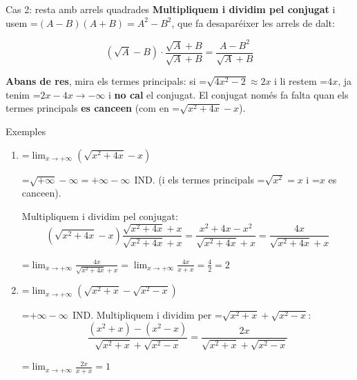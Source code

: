 \documentclass[11pt,a4paper]{article}
\newcommand{\fmm}[1]{\setbox0=\hbox{$#1$}\ifdim\wd0>\linewidth\[#1\]\else\mbox{\box0}\fi}
\newcommand{\fmuline}[1]{\textbf{\color{fmaccent}#1}}
\begin{document}
  
\begin{fmdef}{Cas 2: resta amb arrels quadrades}
\textbf{Multipliquem i dividim pel conjugat} i usem \fmm{(A-B)(A+B)=A^2-B^2}, que fa desaparéixer les arrels de dalt:

      
\[\left(\sqrt{A}-B\right)\cdot\frac{\sqrt{A}+B}{\sqrt{A}+B}=\frac{A-B^2}{\sqrt{A}+B}\]

      
\begin{fmnote}\fmuline{Abans de res}, mira els termes principals: si \fmm{\sqrt{4x^2-2}\approx2x} i li restem \fmm{4x}, ja tenim \fmm{2x-4x\to-\infty} i \textbf{no cal} el conjugat. El conjugat només fa falta quan els termes principals \textbf{es cance\lgem{}en} (com en \fmm{\sqrt{x^2+4x}-x}).\end{fmnote}
\end{fmdef}

  
\begin{fmex}{Exemples}
\begin{enumerate}[label=\textbf{\arabic*.},leftmargin=*]
\item \fmm{\displaystyle\lim_{x\to+\infty}\left(\sqrt{x^2+4x}-x\right)}
          

            

\fmm{\sqrt{+\infty}-\infty=+\infty-\infty\ \ \text{IND.}} (i els termes principals \fmm{\sqrt{x^2}=x} i \fmm{x} es cance\lgem{}en).

            

Multipliquem i dividim pel conjugat: 
\[\left(\sqrt{x^2+4x}-x\right)\frac{\sqrt{x^2+4x}+x}{\sqrt{x^2+4x}+x}=\frac{x^2+4x-x^2}{\sqrt{x^2+4x}+x}=\frac{4x}{\sqrt{x^2+4x}+x}\]

            

\fmm{\displaystyle\lim_{x\to+\infty}\frac{4x}{\sqrt{x^2+4x}+x}=\lim_{x\to+\infty}\frac{4x}{x+x}=\frac{4}{2}=2}
\item \fmm{\displaystyle\lim_{x\to+\infty}\left(\sqrt{x^2+x}-\sqrt{x^2-x}\right)}
          

            

\fmm{+\infty-\infty\ \ \text{IND.}} Multipliquem i dividim per \fmm{\sqrt{x^2+x}+\sqrt{x^2-x}}: 
\[\frac{(x^2+x)-(x^2-x)}{\sqrt{x^2+x}+\sqrt{x^2-x}}=\frac{2x}{\sqrt{x^2+x}+\sqrt{x^2-x}}\]

            

\fmm{\displaystyle\lim_{x\to+\infty}\frac{2x}{x+x}=1}
\end{enumerate}
\end{fmex}
\end{document}
